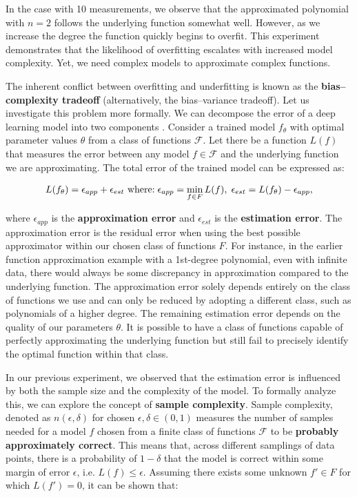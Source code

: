 In the case with 10 measurements, we observe that the approximated polynomial with $n = 2$ follows the underlying function somewhat well. However, as we increase the degree the function quickly begins to overfit. This experiment demonstrates that the likelihood of overfitting escalates with increased model complexity. Yet, we need complex models to approximate complex functions.

The inherent conflict between overfitting and underfitting is known as the \textbf{bias--complexity tradeoff} (alternatively, the bias–variance tradeoff). Let us investigate this problem more formally. We can decompose the error of a deep learning model into two components \cite{shalev-shwartzUnderstandingMachineLearning2014}. Consider a trained model $f_\theta$ with optimal parameter values $\theta$ from a class of functions $\mathcal{F}$. Let there be a function $L(f)$ that measures the error between any model $f \in \mathcal{F}$ and the underlying function we are approximating. The total error of the trained model can be expressed as:

\begin{equation}
	L(f_\theta) = \epsilon_{app} + \epsilon_{est}
	\text{ where:\;}  \epsilon_{app} = \min_{f \in F}L(f),\;
	\epsilon_{est} = L(f_\theta) - \epsilon_{app},
\end{equation}

where $\epsilon_{app}$ is the \textbf{approximation error} and $\epsilon_{est}$ is the \textbf{estimation error}. The approximation error is the residual error when using the best possible approximator within our chosen class of functions $F$. For instance, in the earlier function approximation example with a 1st-degree polynomial, even with infinite data, there would always be some discrepancy in approximation compared to the underlying function. The approximation error solely depends entirely on the class of functions we use and can only be reduced by adopting a different class, such as polynomials of a higher degree. The remaining estimation error depends on the quality of our parameters $\theta$. It is possible to have a class of functions capable of perfectly approximating the underlying function but still fail to precisely identify the optimal function within that class.

In our previous experiment, we observed that the estimation error is influenced by both the sample size and the complexity of the model. To formally analyze this, we can explore the concept of \textbf{sample complexity}. Sample complexity, denoted as $n(\epsilon, \delta)$ for chosen $\epsilon, \delta \in (0, 1)$ measures the number of samples needed for a model $f$ chosen from a finite class of functions $\mathcal{F}$ to be \textbf{probably approximately correct}. This means that, across different samplings of data points, there is a probability of $1 - \delta$ that the model is correct within some margin of error $\epsilon$, i.e. $L(f) \leq \epsilon$. Assuming there exists some unknown $f' \in F$ for which $L(f') = 0$, it can be shown \cite{shalev-shwartzUnderstandingMachineLearning2014} that:

